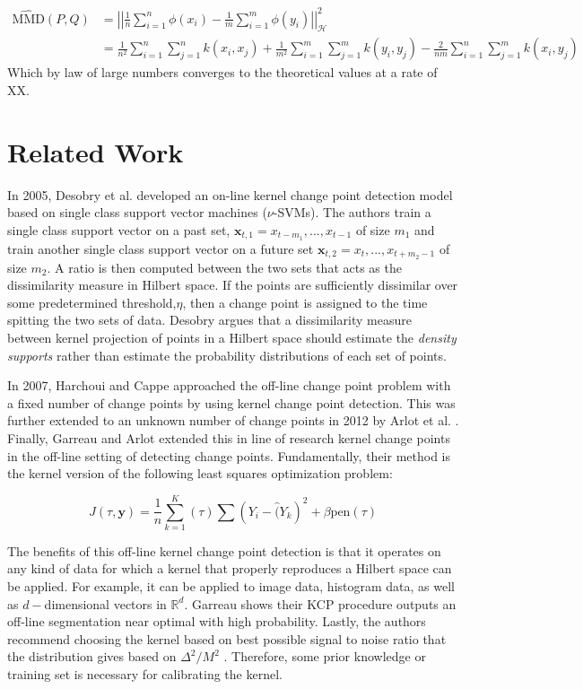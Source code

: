 \begin{align*}
\widehat{\text{MMD}}(P,Q) &= \left| \left| \frac{1}{n}\sum_{i=1}^n \phi(x_i) - \frac{1}{m}\sum_{i=1}^m \phi(y_i) \right| \right|_{\mathcal{H}}^2 \\
&= \frac{1}{n^2} \sum_{i=1}^n\sum_{j=1}^n k(x_i, x_j) + \frac{1}{m^2} \sum_{i=1}^m\sum_{j=1}^m k(y_i, y_j) - \frac{2}{nm} \sum_{i=1}^n\sum_{j=1}^m k(x_i, y_j) 
\end{align*}
Which by law of large numbers converges to the theoretical values at a rate of XX.

\section{Related Work}

In 2005, Desobry et al. \cite{desobry2005online} developed an on-line kernel change point detection model based on single class support vector machines ($\nu$-SVMs). The authors train a single class support vector on a past set, $\mathbf{x}_{t,1}={x_{t-m_1},...,x_{t-1}}$ of size $m_1$ and train another single class support vector on a future set $\mathbf{x}_{t,2}={x_t,...,x_{t+m_2-1}}$ of size $m_2$. A ratio is then computed between the two sets that acts as the dissimilarity measure in Hilbert space. If the points are sufficiently dissimilar over some predetermined threshold,$\eta$, then a change point is assigned to the time spitting the two sets of data. Desobry argues that a dissimilarity measure between kernel projection of points in a Hilbert space should estimate the \textit{density supports} rather than estimate the probability distributions of each set of points. 

In 2007, Harchoui and Cappe \cite{harchaoui2007retrospective} approached the off-line change point problem with a fixed number of change points by using kernel change point detection. This was further extended to an unknown number of change points in 2012 by Arlot et al. \cite{arlot2012kernel}. Finally, Garreau and Arlot extended this in line of research kernel change points in the off-line setting of detecting change points. Fundamentally, their method is the kernel version of the following least squares optimization problem:

\begin{equation}
J(\tau, \mathbf{y}) = \frac{1}{n} \sum_{k=1}^K(\tau) \sum (Y_i - \hat(Y_k)^2 + \beta \text{pen}(\tau)
\end{equation}


The benefits of this off-line kernel change point detection is that it operates on any kind of data for which a kernel that properly reproduces a Hilbert space can be applied. For example, it can be applied to image data, histogram data, as well as $d-$dimensional vectors in $\mathbb{R}^d$. Garreau shows their KCP procedure outputs an off-line segmentation near optimal with high probability. Lastly, the authors recommend choosing the kernel based on best possible signal to noise ratio that the distribution gives based on $ \Delta^2 / M^2$ . Therefore, some prior knowledge or training set is necessary for calibrating the kernel. 

